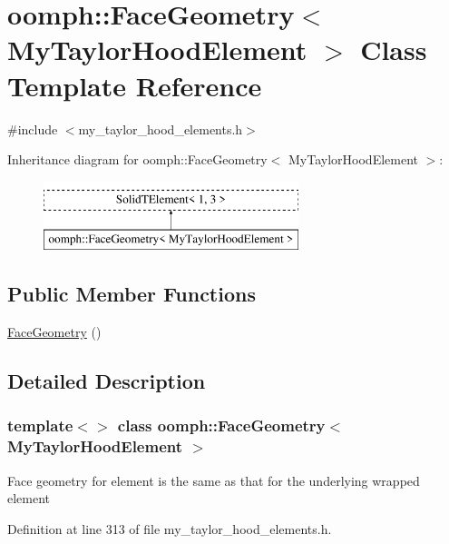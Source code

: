 \hypertarget{classoomph_1_1FaceGeometry_3_01MyTaylorHoodElement_01_4}{}\section{oomph\+:\+:Face\+Geometry$<$ My\+Taylor\+Hood\+Element $>$ Class Template Reference}
\label{classoomph_1_1FaceGeometry_3_01MyTaylorHoodElement_01_4}


{\ttfamily \#include $<$my\+\_\+taylor\+\_\+hood\+\_\+elements.\+h$>$}

Inheritance diagram for oomph\+:\+:Face\+Geometry$<$ My\+Taylor\+Hood\+Element $>$\+:\begin{figure}[H]
\begin{center}
\leavevmode
\includegraphics[height=2.000000cm]{classoomph_1_1FaceGeometry_3_01MyTaylorHoodElement_01_4}
\end{center}
\end{figure}
\subsection*{Public Member Functions}
\begin{DoxyCompactItemize}
\item 
\hyperlink{classoomph_1_1FaceGeometry_3_01MyTaylorHoodElement_01_4_a604dfaeec030bb7a08069c0e2c8805ab}{Face\+Geometry} ()
\end{DoxyCompactItemize}


\subsection{Detailed Description}
\subsubsection*{template$<$$>$\newline
class oomph\+::\+Face\+Geometry$<$ My\+Taylor\+Hood\+Element $>$}

Face geometry for element is the same as that for the underlying wrapped element 

Definition at line 313 of file my\+\_\+taylor\+\_\+hood\+\_\+elements.\+h.



